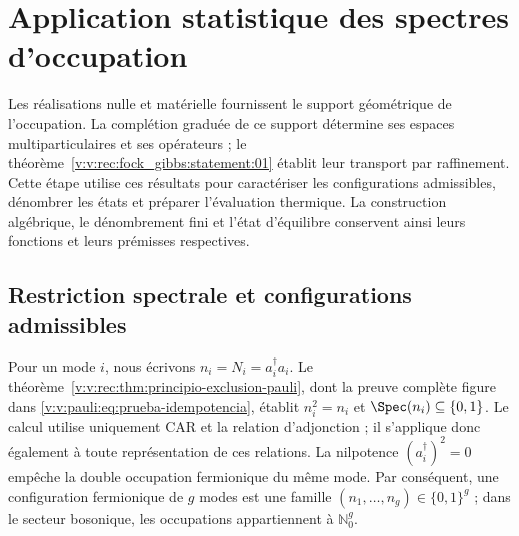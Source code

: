 \section{Application statistique des spectres d’occupation}
\label{v:v:rec:chap:ocupacion-estadistica}

Les réalisations nulle et matérielle fournissent le support géométrique de
l’occupation. La complétion graduée de ce support détermine ses espaces
multiparticulaires et ses opérateurs ; le
théorème~\ref{v:v:rec:fock_gibbs:statement:01} établit leur transport par
raffinement. Cette étape utilise ces résultats pour caractériser les
configurations admissibles, dénombrer les états et préparer l’évaluation thermique.
La construction algébrique, le dénombrement fini et l’état d’équilibre
conservent ainsi leurs fonctions et leurs prémisses respectives.

\subsection{Restriction spectrale et configurations admissibles}
\label{v:v:rec:pauli:section:02}

Pour un mode \(i\), nous écrivons \(n_i=N_i=a_i^\dagger a_i\). Le
théorème~\ref{v:v:rec:thm:principio-exclusion-pauli}, dont la preuve complète figure dans
\eqref{v:v:pauli:eq:prueba-idempotencia}, établit
\(n_i^2=n_i\) et \(\Spec(n_i)\subseteq\{0,1\}\). Le calcul utilise
uniquement CAR et la relation d’adjonction ; il s’applique donc également
à toute représentation de ces relations. La nilpotence
\((a_i^\dagger)^2=0\) empêche la double occupation fermionique du même mode.
Par conséquent, une configuration fermionique de \(g\) modes est une
famille \((n_1,\ldots,n_g)\in\{0,1\}^g\) ; dans le secteur bosonique, les
occupations appartiennent à \(\mathbb N_0^g\).

